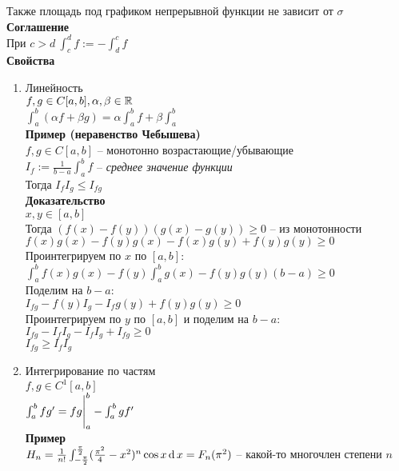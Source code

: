 \documentclass[12pt]{article}
\begin{document}
Также площадь под графиком непрерывной функции не зависит от $\sigma$\\
\textbf{Соглашение}\\
При $c > d\ \int_c^d f := - \int_d^c f$\\
\textbf{Свойства}
\begin{enumerate}
    \item Линейность\\
    $f, g \in C[a,b], \alpha, \beta \in \mathbb{R}$\\
    $\int_a^b (\alpha f + \beta g) = \alpha \int_a^b f + \beta \int_a^b$\\
    \textbf{Пример (неравенство Чебышева)}\\
    $f, g \in C[a,b]$ -- монотонно возрастающие/убывающие\\
    $I_f := \frac1{b-a}\int_a^b f$ -- \textit{среднее значение функции}\\
    Тогда $I_f I_g \leq I_{fg}$\\
    \textbf{Доказательство}\\
    $x,y \in [a,b]$\\
    Тогда $(f(x)-f(y))(g(x)-g(y)) \geq 0$ -- из монотонности\\
    $f(x)g(x) - f(y)g(x)-f(x)g(y)+f(y)g(y) \geq 0$\\
    Проинтегрируем по $x$ по $[a,b]$:\\
    $\int_a^b f(x)g(x) - f(y)\int_a^b g(x) - f(y)g(y)(b-a) \geq 0$\\
    Поделим на $b-a$:\\
    $I_{fg} - f(y)I_g - I_f g(y) + f(y)g(y) \geq 0$\\
    Проинтегрируем по $y$ по $[a,b]$ и поделим на $b-a$:\\
    $I_{fg} - I_fI_g-I_fI_g + I_{fg} \geq 0$\\
    $I_{fg} \geq I_fI_g$
    \item Интегрирование по частям\\
    $f, g \in C^1[a,b]$\\
    $\int_a^b fg' = fg\Biggr|_a^b - \int_a^b gf'$\\
    \textbf{Пример}\\
    $H_n = \frac{1}{n!}\int_{-\frac\pi2}^{\frac\pi2}(\frac{\pi^2}4 - x^2)^n\cos x \operatorname{d} x = F_n(\pi^2)$ -- какой-то многочлен степени $n$\\

\end{enumerate}
\end{document}
